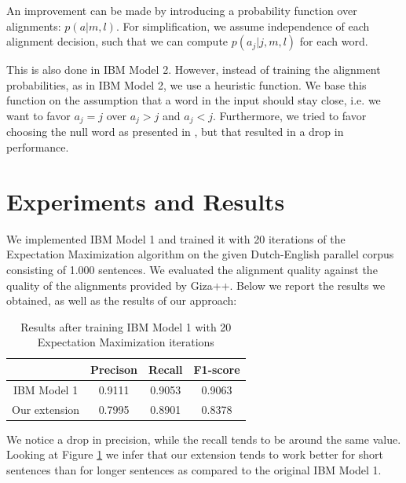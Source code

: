 \documentclass[11pt]{article}
\begin{document}
An improvement can be made by introducing a probability function over alignments: $p(a|m,l)$. 
For simplification, we assume independence of each alignment decision, such that we can compute $p(a_j|j,m,l)$ for each word.

This is also done in IBM Model 2. However,  instead of training the alignment probabilities, as in IBM Model 2, we use a heuristic function. We base this function on the assumption that a word in the input should stay close, i.e. we want to favor $a_j=j$ over $a_j>j$ and $a_j<j$. Furthermore, we tried to favor choosing the null word as presented in \cite{Moore:2004}, but that resulted in a drop in performance.

\section{Experiments and Results}
\label{Eval}
We implemented IBM Model 1 and trained it with 20 iterations of the Expectation Maximization algorithm on the given Dutch-English parallel corpus consisting of 1.000 sentences. We evaluated the alignment quality against the quality of the alignments provided by Giza++. Below we report the results we obtained, as well as the results of our approach:

\begin{table}[h]
\centering
\begin{tabular}{|c | c | c | c |}
  \hline
  & \textbf{Precison} & \textbf{Recall} & \textbf{F1-score} \\
  \hline 
  IBM Model 1 & 0.9111 & 0.9053 & 0.9063\\
  Our extension & 0.7995 & 0.8901 & 0.8378\\
  \hline
\end{tabular}
\caption{Results after training IBM Model 1 with 20 Expectation Maximization iterations}
\label{results}
\end{table}

We notice a drop in precision, while the recall tends to be around the same value. Looking at Figure \ref{results} we infer that our extension tends to work better for short sentences than for longer sentences as compared to the original IBM Model 1.
\end{document}
